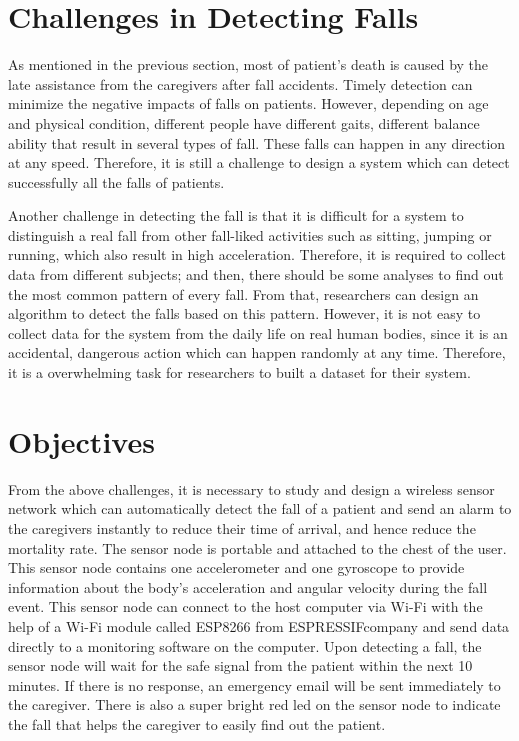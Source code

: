 \documentclass[letterpaper,12pt,titlepage,oneside,final]{book}
\begin{document}
\section{Challenges in Detecting Falls}
As mentioned in the previous section, most of patient's death is caused by the late assistance from the caregivers after fall accidents. Timely detection can minimize the negative impacts of falls on patients. However, depending on age and physical condition, different people have different gaits, different balance ability that result in several types of fall. These falls can happen in any direction at any speed. Therefore, it is still a challenge to design a system which can detect successfully all the falls of patients. \par
Another challenge in detecting the fall is that it is difficult for a system to distinguish a real fall from other fall-liked activities such as sitting, jumping or running, which also result in high acceleration. Therefore, it is required to collect data from different subjects; and then, there should be some analyses to find out the most common pattern of every fall. From that, researchers can design an algorithm to detect the falls based on this pattern. However, it is not easy to collect data for the system from the daily life on real human bodies, since it is an accidental, dangerous action which can happen randomly at any time. Therefore, it is a overwhelming task for researchers to built a dataset for their system. 

\section{Objectives}
From the above challenges, it is necessary to study and design a wireless sensor network which can automatically detect the fall of a patient and send an alarm to the caregivers instantly to reduce their time of arrival, and hence reduce the mortality rate. The sensor node is portable and attached to the chest of the user. This sensor node contains one accelerometer and one gyroscope to provide information about the body's acceleration and angular velocity during the fall event. This sensor node can connect to the host computer via Wi-Fi with the help of a Wi-Fi module called ESP8266 from ESPRESSIF\textregistered company and send data directly to a monitoring software on the computer. Upon detecting a fall, the sensor node will wait for the safe signal from the patient within the next 10 minutes. If there is no response, an emergency email will be sent immediately to the caregiver. There is also a super bright red led on the sensor node to indicate the fall that helps the caregiver to easily find out the patient. 
\end{document}
